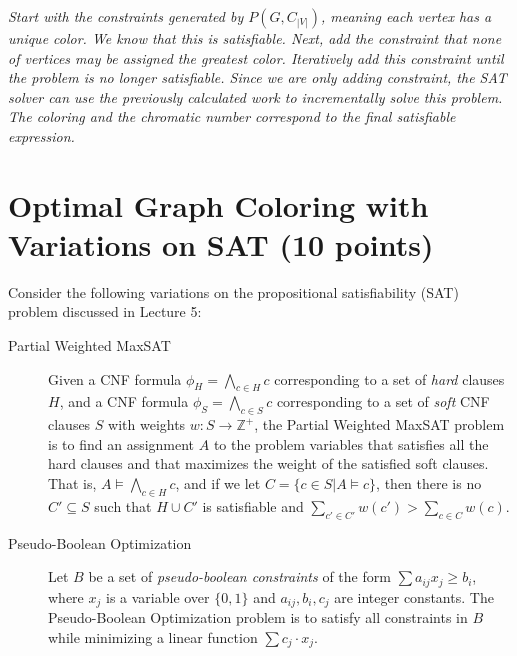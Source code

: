 \documentclass{article}
\newenvironment{solution}{\color{blue} \em }{}
\begin{document}
\begin{enumerate}
\begin{solution}

\end{solution}

\begin{solution}
    Start with the constraints generated by $P(G, C_{|V|})$, meaning each vertex has a unique color. We know that this is satisfiable. Next, add the constraint that none of vertices may be assigned the greatest color. Iteratively add this constraint until the problem is no longer satisfiable. Since we are only adding constraint, the SAT solver can use the previously calculated work to incrementally solve this problem. The coloring and the chromatic number correspond to the final satisfiable expression.
\end{solution}

\end{enumerate}

\section{Optimal Graph Coloring with Variations on SAT (10 points)}\label{varsat}


Consider the following variations on the propositional satisfiability (SAT) problem discussed in Lecture 5:

\begin{description}

	\item[Partial Weighted MaxSAT] Given a CNF formula $\phi_H = \bigwedge_{c \in H} c$ corresponding to a set of \emph{hard} clauses $H$, and a CNF formula $\phi_S = \bigwedge_{c \in S} c$ corresponding to a set of \emph{soft} CNF clauses $S$ with weights $w : S \rightarrow \mathbb{Z^+}$, the Partial Weighted MaxSAT problem is to find an assignment $A$ to the problem variables that satisfies all the hard clauses and that maximizes the weight of the satisfied soft clauses. That is, $A \models \bigwedge_{c \in H} c$, and if we let $C = \{ c\in S | A\models c\}$, then there is no $C'\subseteq S$ such that $H\cup C'$ is satisfiable and $\sum_{c'\in C'} w(c') > \sum_{c\in C} w(c)$.

	\item[Pseudo-Boolean Optimization]  Let $B$ be a set of \emph{pseudo-boolean constraints} of the form $\sum a_{ij}x_j \geq b_i$, where $x_j$ is a variable over $\{0, 1\}$ and $a_{ij}, b_i, c_j$ are integer constants.  The Pseudo-Boolean Optimization problem is to satisfy all constraints in $B$ while minimizing a linear function $\sum c_j \cdot x_j$.
\end{description}
%
\end{document}
